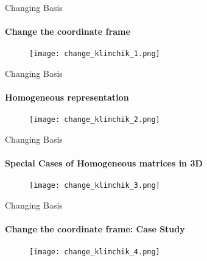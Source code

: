 \documentclass[aspectratio=169]{beamer}
\begin{document}
\begin{frame}[t]{Changing Basis}
    \framesubtitle{Change the coordinate frame}
    \vspace{-0.6cm}
    \begin{figure}[H]
        \centering\texttt{[image: change\_klimchik\_1.png]}
        \label{fig:change_klimchik_1.png}
    \end{figure}
\end{frame}

\begin{frame}[t]{Changing Basis}
    \framesubtitle{Homogeneous representation}
    \vspace{-0.6cm}
    \begin{figure}[H]
        \centering\texttt{[image: change\_klimchik\_2.png]}
        \label{fig:change_klimchik_2.png}
    \end{figure}
\end{frame}

\begin{frame}[t]{Changing Basis}
    \framesubtitle{Special Cases of Homogeneous matrices in 3D}
    \vspace{-0.6cm}
    \begin{figure}[H]
        \centering\texttt{[image: change\_klimchik\_3.png]}
        \label{fig:change_klimchik_3.png}
    \end{figure}
\end{frame}

\begin{frame}[t]{Changing Basis}
    \framesubtitle{Change the coordinate frame: Case Study}
    \vspace{-0.6cm}
    \begin{figure}[H]
        \centering\texttt{[image: change\_klimchik\_4.png]}
        \label{fig:change_klimchik_4.png}
    \end{figure}
\end{frame}
\end{document}
